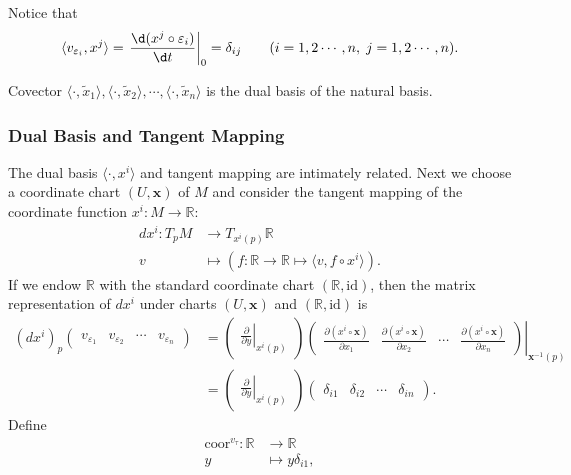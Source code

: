 \documentclass{report}
\begin{document}
Notice that
\[
    \langle v_{\varepsilon_i}, x^j\rangle=\left.\frac{\d( x^j\circ\varepsilon_i)}{\d t}\right|_0=\delta_{ij}\qquad(i=1,2\cdots,n,\;j=1,2\cdots,n).
\]

Covector $\langle\cdot,\tilde{x}_1\rangle,\langle\cdot,\tilde{x}_2\rangle,\cdots,\langle\cdot,\tilde{x}_n\rangle$ is the dual basis of the natural basis.

\subsubsection{Dual Basis and Tangent Mapping}
The dual basis $\langle\cdot,{x}^i\rangle$ and tangent mapping are intimately related. 
Next we choose a coordinate chart $(U,\mathbf{x})$ of $M$ and consider the tangent mapping of the coordinate function ${x}^i: M\to \mathbb{R}$:
\[
    \begin{aligned}
        d{x}^i:T_pM&\longrightarrow T_{{x}^i(p)}\mathbb{R}\\
        v&\longmapsto \left(f:\mathbb{R}\to \mathbb{R} \longmapsto\langle v,f\circ {x}^i\rangle\right).
    \end{aligned}
\]
If we endow $\mathbb{R}$ with the standard coordinate chart $(\mathbb{R},\mathrm{id})$, then the matrix representation of $d{x}^i$ under charts $(U,\mathbf{x})$ and $(\mathbb{R},\mathrm{id})$ is
\[
    \begin{aligned}
    (d{x}^i)_p
    \begin{pmatrix}
    v_{\varepsilon_1}&v_{\varepsilon_2}&\cdots&v_{\varepsilon_n}
    \end{pmatrix}
    &=
    \begin{pmatrix}
        \left.\frac{\partial}{\partial y}\right|_{{x}^i(p)}
    \end{pmatrix}
    \left.\begin{pmatrix}
        \frac{\partial({x}^i\circ\mathbf{x})}{\partial
x_1}&\frac{\partial({x}^i\circ\mathbf{x})}{\partial
x_2}&\cdots&\frac{\partial({x}^i\circ\mathbf{x})}{\partial x_n}
    \end{pmatrix}\right|_{\mathbf{x}^{-1}(p)}\\
    &=\begin{pmatrix}
        \left.\frac{\partial}{\partial y}\right|_{{x}^i(p)}
    \end{pmatrix}
    \begin{pmatrix}
        \delta_{i1} &\delta_{i2}&\cdots&\delta_{in}
    \end{pmatrix}.
    \end{aligned}
    \]
Define
\[
    \begin{aligned}
        \mathrm{coor}^{v_{\tau}}:\mathbb{R}&\longrightarrow\mathbb{R}\\
        y&\longmapsto y\delta_{i1},
    \end{aligned}
\]
\end{document}
